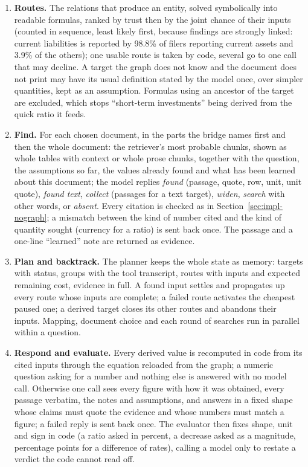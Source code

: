 \begin{enumerate}
\item \textbf{Routes.} The relations that produce an entity, solved symbolically into readable formulas, ranked by trust then by the joint chance of their inputs (counted in sequence, least likely first, because findings are strongly linked: current liabilities is reported by 98.8\% of filers reporting current assets and 3.9\% of the others); one usable route is taken by code, several go to one call that may decline. A target the graph does not know and the document does not print may have its usual definition stated by the model once, over simpler quantities, kept as an assumption. Formulas using an ancestor of the target are excluded, which stops ``short-term investments'' being derived from the quick ratio it feeds.
\item \textbf{Find.} For each chosen document, in the parts the bridge names first and then the whole document: the retriever's most probable chunks, shown as whole tables with context or whole prose chunks, together with the question, the assumptions so far, the values already found and what has been learned about this document; the model replies \emph{found} (passage, quote, row, unit, unit quote), \emph{found text}, \emph{collect} (passages for a text target), \emph{widen}, \emph{search} with other words, or \emph{absent}. Every citation is checked as in Section~\ref{sec:impl-nograph}; a mismatch between the kind of number cited and the kind of quantity sought (currency for a ratio) is sent back once. The passage and a one-line ``learned'' note are returned as evidence.
\item \textbf{Plan and backtrack.} The planner keeps the whole state as memory: targets with status, groups with the tool transcript, routes with inputs and expected remaining cost, evidence in full. A found input settles and propagates up every route whose inputs are complete; a failed route activates the cheapest paused one; a derived target closes its other routes and abandons their inputs. Mapping, document choice and each round of searches run in parallel within a question.
\item \textbf{Respond and evaluate.} Every derived value is recomputed in code from its cited inputs through the equation reloaded from the graph; a numeric question asking for a number and nothing else is answered with no model call. Otherwise one call sees every figure with how it was obtained, every passage verbatim, the notes and assumptions, and answers in a fixed shape whose claims must quote the evidence and whose numbers must match a figure; a failed reply is sent back once. The evaluator then fixes shape, unit and sign in code (a ratio asked in percent, a decrease asked as a magnitude, percentage points for a difference of rates), calling a model only to restate a verdict the code cannot read off.
\end{enumerate}

